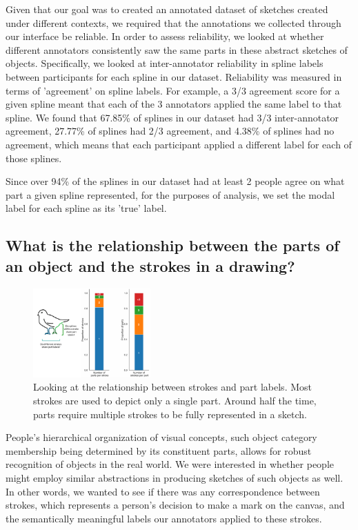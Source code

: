 \documentclass[10pt,letterpaper]{article}
\begin{document}
Given that our goal was to created an annotated dataset of sketches created under different contexts, we required that the annotations we collected through our interface be reliable. 
In order to assess reliability, we looked at whether different annotators consistently saw the same parts in these abstract sketches of objects. 
Specifically, we looked at inter-annotator reliability in spline labels between participants for each spline in our dataset. 
Reliability was measured in terms of 'agreement' on spline labels. 
For example, a 3/3 agreement score for a given spline meant that each of the 3 annotators applied the same label to that spline. 
We found that 67.85\% of splines in our dataset had 3/3 inter-annotator agreement, 27.77\% of splines had 2/3 agreement, and 4.38\% of splines had no agreement, which means that each participant applied a different label for each of those splines.

Since over 94\% of the splines in our dataset had at least 2 people agree on what part a given spline represented, for the purposes of analysis, we set the modal label for each spline as its 'true' label.

\subsection{What is the relationship between the parts of an object and the strokes in a drawing?}

\begin{figure}[htbp]
\centering
\includegraphics[width=0.4\textwidth]{figures/stroke_part_relationship.pdf}
\caption{Looking at the relationship between strokes and part labels. Most strokes are used to depict only a single part. Around half the time, parts require multiple strokes to be fully represented in a sketch. }
\label{stroke_to_part}
\end{figure}

People's hierarchical organization of visual concepts, such object category membership being determined by its constituent parts, allows for robust recognition of objects in the real world. 
We were interested in whether people might employ similar abstractions in producing sketches of such objects as well. 
In other words, we wanted to see if there was any correspondence between strokes, which represents a person's decision to make a mark on the canvas, and the semantically meaningful labels our annotators applied to these strokes.
\end{document}
